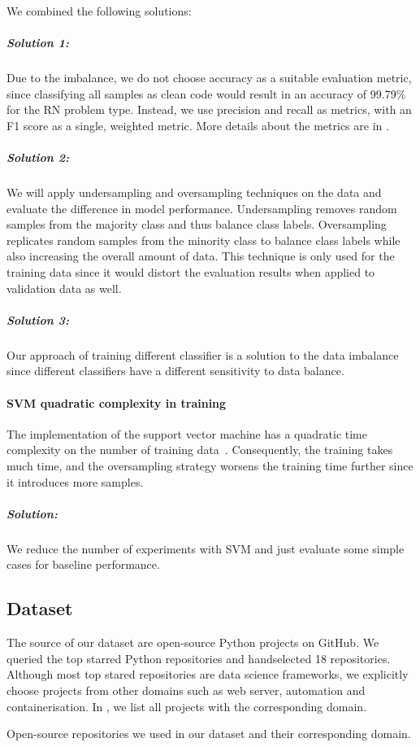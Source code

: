 We combined the following solutions:
\subparagraph{Solution 1:}
Due to the imbalance, we do not choose accuracy as a suitable evaluation metric, since classifying all samples as clean code would result in an accuracy of 99.79\% for the RN problem type. Instead, we use precision and recall as metrics, with an F1 score as a single, weighted metric. More details about the metrics are in .

\subparagraph{Solution 2:}
We will apply undersampling and oversampling techniques on the data and evaluate the difference in model performance. Undersampling removes random samples from the majority class and thus balance class labels. Oversampling replicates random samples from the minority class to balance class labels while also increasing the overall amount of data. This technique is only used for the training data since it would distort the evaluation results when applied to validation data as well.

\subparagraph{Solution 3:}
Our approach of training different classifier is a solution to the data imbalance since different classifiers have a different sensitivity to data balance. 

\paragraph{SVM quadratic complexity in training}\label{sec:svm_quadratic_complexity}
The implementation of the support vector machine has a quadratic time complexity on the number of training data~\cite{abdiansah_time_2015}. Consequently, the training takes much time, and the oversampling strategy worsens the training time further since it introduces more samples.
\subparagraph{Solution:}
We reduce the number of experiments with SVM and just evaluate some simple cases for baseline performance. 


\subsection{Dataset}\label{chap:clean_code_classification_dataset}
The source of our dataset are open-source Python projects on GitHub. We queried the top starred Python repositories and handselected 18 repositories. Although most top stared repositories are data science frameworks, we explicitly choose projects from other domains such as web server, automation and containerisation. In , we list all projects with the corresponding domain.
\begin{table}[h]
    \centering
    \caption{Open-source repositories we used in our dataset and their corresponding domain. }
    \label{tab:repos_domains}
\end{table}

